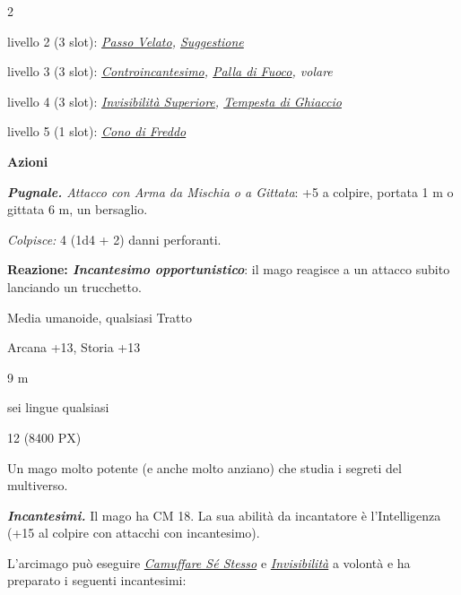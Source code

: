 \begin{multicols}{2}
{livello 2 (3 slot): \emph{\hyperlink{Passo Velato}{Passo Velato}, \hyperlink{Suggestione}{Suggestione}}

livello 3 (3 slot): \emph{\hyperlink{Controincantesimo}{Controincantesimo}, \hyperlink{Palla di Fuoco}{Palla di Fuoco}, volare}

livello 4 (3 slot): \emph{\hyperlink{Invisibilità Superiore}{Invisibilità Superiore}, \hyperlink{Tempesta di Ghiaccio}{Tempesta di Ghiaccio}}

livello 5 (1 slot): \emph{\hyperlink{Cono di Freddo}{Cono di Freddo}}

\textbf{Azioni}

\emph{\textbf{Pugnale.} Attacco con Arma da Mischia o a Gittata}: +5 a colpire, portata 1 m o gittata 6 m, un bersaglio.

\emph{Colpisce:} 4 (1d4 + 2) danni perforanti.

\textbf{Reazione: \emph{Incantesimo opportunistico}}: il mago reagisce a un attacco subito lanciando un trucchetto.

\begin{description}[noitemsep, topsep=0pt, parsep=0pt, partopsep=0pt, itemsep=1pt, leftmargin=2.35cm,  labelwidth=2.2cm, itemindent=0cm, listparindent=0pt] %
\setlength{\baselineskip}{10pt}
\item[\textbf{Taglia/Tipo}] Media umanoide, qualsiasi Tratto
\item[\textbf{Caratt.}] 
\item[\textbf{Punti Ferita}] 
\item[\textbf{Comp.}] Arcana +13, Storia +13
\item[\textbf{Tiri Salvez.}] 
\item[\textbf{Movimento}] 9 m
\item[\textbf{Linguaggi}] sei lingue qualsiasi
\item[\textbf{Sfida}] 12 (8400 PX)
\end{description}
\smallskip

Un mago molto potente (e anche molto anziano) che studia i segreti del multiverso.

\emph{\textbf{Incantesimi.}} Il mago ha CM 18. La sua abilità da incantatore è l'Intelligenza (+15 al colpire con attacchi con incantesimo).

L'arcimago può eseguire \emph{\hyperlink{Camuffare Sé Stesso}{Camuffare Sé Stesso}} e \emph{\hyperlink{Invisibilità}{Invisibilità}} a volontà e ha preparato i seguenti incantesimi:

}
\end{multicols}
